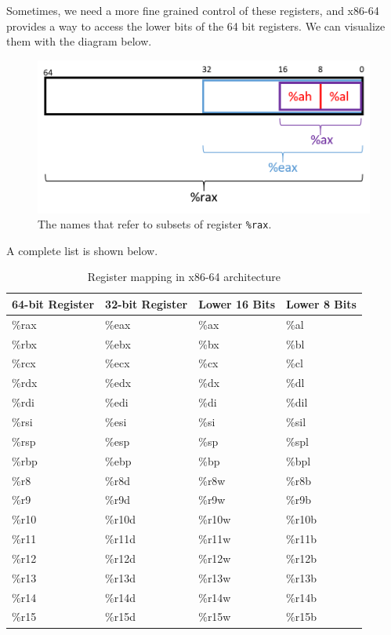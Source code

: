 \documentclass{article}
\begin{document}
  \begin{definition}
    Sometimes, we need a more fine grained control of these registers, and x86-64 provides a way to access the lower bits of the 64 bit registers. We can visualize them with the diagram below. 
    \begin{figure}[H]
      \centering 
      \includegraphics[scale=0.6]{img/register_subsets.png}
      \caption{The names that refer to subsets of register \texttt{\%rax}.} 
      \label{fig:register_subsets}
    \end{figure}
    A complete list is shown below. 
    \begin{table}[H]
      \centering
      \begin{tabular}{|l|l|l|l|}
      \hline
      \textbf{64-bit Register} & \textbf{32-bit Register} & \textbf{Lower 16 Bits} & \textbf{Lower 8 Bits} \\ \hline
      \%rax & \%eax & \%ax & \%al \\ \hline
      \%rbx & \%ebx & \%bx & \%bl \\ \hline
      \%rcx & \%ecx & \%cx & \%cl \\ \hline
      \%rdx & \%edx & \%dx & \%dl \\ \hline
      \%rdi & \%edi & \%di & \%dil \\ \hline
      \%rsi & \%esi & \%si & \%sil \\ \hline
      \%rsp & \%esp & \%sp & \%spl \\ \hline
      \%rbp & \%ebp & \%bp & \%bpl \\ \hline
      \%r8 & \%r8d & \%r8w & \%r8b \\ \hline
      \%r9 & \%r9d & \%r9w & \%r9b \\ \hline
      \%r10 & \%r10d & \%r10w & \%r10b \\ \hline
      \%r11 & \%r11d & \%r11w & \%r11b \\ \hline
      \%r12 & \%r12d & \%r12w & \%r12b \\ \hline
      \%r13 & \%r13d & \%r13w & \%r13b \\ \hline
      \%r14 & \%r14d & \%r14w & \%r14b \\ \hline
      \%r15 & \%r15d & \%r15w & \%r15b \\ \hline
      \end{tabular}
      \caption{Register mapping in x86-64 architecture}
      \label{table:register_mapping}
    \end{table}
  \end{definition}
\end{document}
